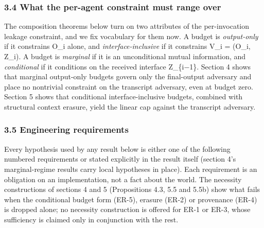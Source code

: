 \documentclass[
  11pt,
]{article}
\begin{document}
\subsubsection{3.4 What the per-agent constraint must range
over}\label{what-the-per-agent-constraint-must-range-over}

The composition theorems below turn on two attributes of the
per-invocation leakage constraint, and we fix vocabulary for them now. A
budget is \emph{output-only} if it constrains O\_i alone, and
\emph{interface-inclusive} if it constrains V\_i = (O\_i, Z\_i). A
budget is \emph{marginal} if it is an unconditional mutual information,
and \emph{conditional} if it conditions on the received interface
Z\_\{i−1\}. Section 4 shows that marginal output-only budgets govern
only the final-output adversary and place no nontrivial constraint on
the transcript adversary, even at budget zero. Section 5 shows that
conditional interface-inclusive budgets, combined with structural
context erasure, yield the linear cap against the transcript adversary.

\subsubsection{3.5 Engineering
requirements}\label{engineering-requirements}

Every hypothesis used by any result below is either one of the following
numbered requirements or stated explicitly in the result itself (section
4's marginal-regime results carry local hypotheses in place). Each
requirement is an obligation on an implementation, not a fact about the
world. The necessity constructions of sections 4 and 5 (Propositions
4.3, 5.5 and 5.5b) show what fails when the conditional budget form
(ER-5), erasure (ER-2) or provenance (ER-4) is dropped alone; no
necessity construction is offered for ER-1 or ER-3, whose sufficiency is
claimed only in conjunction with the rest.
\end{document}
